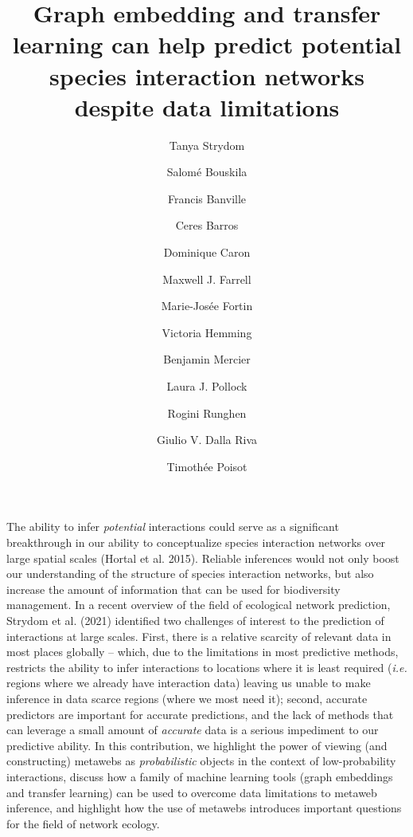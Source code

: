 \documentclass[
  letterpaper,
  DIV=11,
  numbers=noendperiod]{scrartcl}
\title{Graph embedding and transfer learning can help predict potential
species interaction networks despite data limitations}
\author{Tanya Strydom \and Salomé Bouskila \and Francis
Banville \and Ceres Barros \and Dominique Caron \and Maxwell J.
Farrell \and Marie-Josée Fortin \and Victoria Hemming \and Benjamin
Mercier \and Laura J. Pollock \and Rogini Runghen \and Giulio V. Dalla
Riva \and Timothée Poisot}
\date{}
\begin{document}
\maketitle
The ability to infer \emph{potential} interactions could serve as a
significant breakthrough in our ability to conceptualize species
interaction networks over large spatial scales (Hortal et al. 2015).
Reliable inferences would not only boost our understanding of the
structure of species interaction networks, but also increase the amount
of information that can be used for biodiversity management. In a recent
overview of the field of ecological network prediction, Strydom et al.
(2021) identified two challenges of interest to the prediction of
interactions at large scales. First, there is a relative scarcity of
relevant data in most places globally -- which, due to the limitations
in most predictive methods, restricts the ability to infer interactions
to locations where it is least required (\emph{i.e.} regions where we
already have interaction data) leaving us unable to make inference in
data scarce regions (where we most need it); second, accurate predictors
are important for accurate predictions, and the lack of methods that can
leverage a small amount of \emph{accurate} data is a serious impediment
to our predictive ability. In this contribution, we highlight the power
of viewing (and constructing) metawebs as \emph{probabilistic} objects
in the context of low-probability interactions, discuss how a family of
machine learning tools (graph embeddings and transfer learning) can be
used to overcome data limitations to metaweb inference, and highlight
how the use of metawebs introduces important questions for the field of
network ecology.
\end{document}
